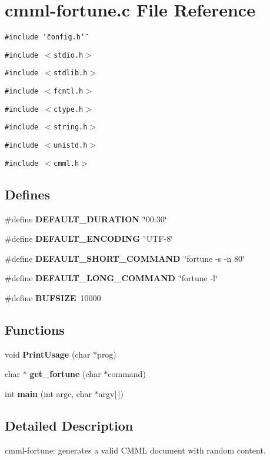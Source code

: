 \section{cmml-fortune.c File Reference}
\label{cmml-fortune_8c}
{\tt \#include \char`\"{}config.h\char`\"{}}\par
{\tt \#include $<$stdio.h$>$}\par
{\tt \#include $<$stdlib.h$>$}\par
{\tt \#include $<$fcntl.h$>$}\par
{\tt \#include $<$ctype.h$>$}\par
{\tt \#include $<$string.h$>$}\par
{\tt \#include $<$unistd.h$>$}\par
{\tt \#include $<$cmml.h$>$}\par
\subsection*{Defines}
\begin{CompactItemize}
\item 
\#define {\bf DEFAULT\_\-DURATION}\ \char`\"{}00:30\char`\"{}
\item 
\#define {\bf DEFAULT\_\-ENCODING}\ \char`\"{}UTF-8\char`\"{}
\item 
\#define {\bf DEFAULT\_\-SHORT\_\-COMMAND}\ \char`\"{}fortune -s -n 80\char`\"{}
\item 
\#define {\bf DEFAULT\_\-LONG\_\-COMMAND}\ \char`\"{}fortune -l\char`\"{}
\item 
\#define {\bf BUFSIZE}\ 10000
\end{CompactItemize}
\subsection*{Functions}
\begin{CompactItemize}
\item 
void {\bf Print\-Usage} (char $\ast$prog)
\item 
char $\ast$ {\bf get\_\-fortune} (char $\ast$command)
\item 
int {\bf main} (int argc, char $\ast$argv[$\,$])
\end{CompactItemize}


\subsection{Detailed Description}
cmml-fortune: generates a valid CMML document with random content.



